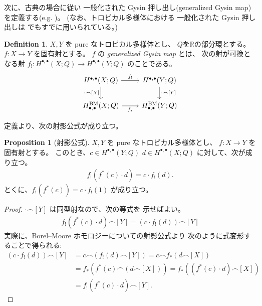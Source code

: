 \documentclass[a4paper,dvipdfmx,reqno,12pt]{amsart}
\theoremstyle{definition}
\newtheorem{definition}[theorem]{Definition}
\newtheorem{proposition}[theorem]{Proposition}
\numberwithin{equation}{section}
\begin{document}
次に、古典の場合に従い
一般化された Gysin 押し出し(generalized Gysin map)
を定義する(e.g. 
\cite[Chapter 13. Appendix]{MR2810322})。
(なお、トロピカル多様体における
一般化された Gysin 押し出しは
\cite[Proposition 8.3]{amini2020hodge} でもすでに用いられている。)
\begin{definition}
$X,Y$ を pure なトロピカル多様体とし、
$Q$を$\mathbb{R}$の部分環とする。
$f\colon X\to Y$ を固有射とする。
$f$ の \emph{generalized Gysin map} とは、
次の射が可換となる射
$f_!\colon H^{\bullet,\bullet}(X;Q)\to 
H^{\bullet,\bullet}(Y;Q)$
のことである。
\begin{equation}
\begin{tikzcd}
	{H^{\bullet,\bullet}(X;Q)} & {H^{\bullet,\bullet}(Y;Q)} \\
	{H_{\bullet,\bullet}^{\mathrm{BM}}(X;Q)} & {H_{\bullet,\bullet}^{\mathrm{BM}}(Y;Q)}
	\arrow["{\cdot \frown [X]}"', from=1-1, to=2-1]
	\arrow["{\cdot\frown[Y]}", from=1-2, to=2-2]
	\arrow["{f_*}"', from=2-1, to=2-2]
	\arrow["{f_!}", from=1-1, to=1-2]
\end{tikzcd}    
\end{equation}

\end{definition}
定義より、次の射影公式が成り立つ。
\begin{proposition}[{射影公式}]
$X,Y$ を pure なトロピカル多様体とし、
$f\colon X\to Y$ を固有射とする。
このとき、$c\in H^{\bullet,\bullet}(Y;Q) $
$d\in H^{\bullet,\bullet}(X;Q)$
に対して、次が成り立つ。
\begin{align}
    f_!(f^{*}(c)\cdot d)=c\cdot f_!(d).
\end{align}
とくに、$f_!(f^{*}(c))=c\cdot f_!(1)$ が成り立つ。
\end{proposition}

\begin{proof}
$\cdot \frown [Y]$ は同型射なので、次の等式を
示せばよい。
\begin{align}
    f_!(f^{*}(c)\cdot d)\frown [Y]=(c\cdot f_!(d))\frown [Y]
\end{align}
実際に、Borel--Moore ホモロジーについての射影公式より
次のように式変形することで得られる:
\begin{align}
(c\cdot f_!(d))\frown [Y]&=
c\frown(f_!(d)\frown [Y])=
c\frown f_*(d\frown [X])\\
&=f_*(f^*(c)\frown (d\frown [X]))
=f_*((f^*(c)\cdot d) \frown [X]) \\
&=f_!(f^{*}(c)\cdot d)\frown [Y].
\end{align}
\end{proof}
\end{document}
